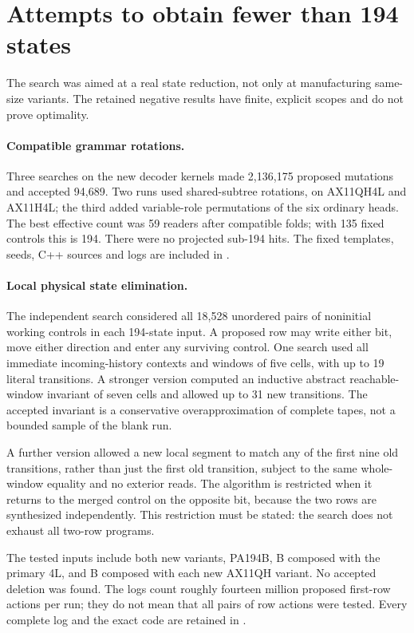 \documentclass[10pt,letterpaper]{article}
\newcommand{\file}[1]{\path{#1}}
\begin{document}
\section{Attempts to obtain fewer than 194 states}
\label{sec:search}

The search was aimed at a real state reduction, not only at manufacturing
same-size variants. The retained negative results have finite, explicit
scopes and do not prove optimality.

\paragraph{Compatible grammar rotations.}
Three searches on the new decoder kernels made 2,136,175 proposed mutations
and accepted 94,689. Two runs used shared-subtree rotations, on AX11QH4L and
AX11H4L; the third added variable-role permutations of the six ordinary
heads. The best effective count was 59 readers after compatible folds;
with 135 fixed controls this is 194. There were no projected sub-194 hits.
The fixed templates, seeds, C++ sources and logs are included in
\file{construction/research/}.

\paragraph{Local physical state elimination.}
The independent search considered all 18,528 unordered pairs of noninitial
working controls in each 194-state input. A proposed row may write either
bit, move either direction and enter any surviving control. One search
used all immediate incoming-history contexts and windows of five cells,
with up to 19 literal transitions. A stronger version computed an inductive
abstract reachable-window invariant of seven cells and allowed up to 31
new transitions. The accepted invariant is a conservative overapproximation
of complete tapes, not a bounded sample of the blank run.

A further version allowed a new local segment to match any of the first
nine old transitions, rather than just the first old transition, subject
to the same whole-window equality and no exterior reads. The algorithm is
restricted when it returns to the merged control on the opposite bit,
because the two rows are synthesized independently. This restriction must
be stated: the search does not exhaust all two-row programs.

The tested inputs include both new variants, PA194B, B composed with the
primary 4L, and B composed with each new AX11QH variant. No accepted deletion
was found. The logs count roughly fourteen million proposed first-row
actions per run; they do not mean that all pairs of row actions were tested.
Every complete log and the exact code are retained in
\file{research/local/}.
\end{document}
